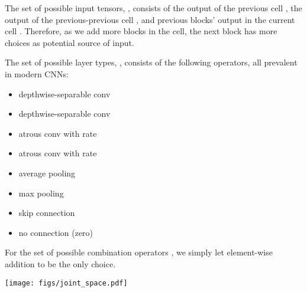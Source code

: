 \documentclass[10pt,twocolumn,letterpaper]{article}
\makeatletter
\def\@onedot{\ifx\@let@token.\else.\null\fi\xspace}
\DeclareRobustCommand\onedot{\futurelet\@let@token\@onedot}
\newcommand{\secref}[1]{Sec\onedot~\ref{#1}}
\makeatother
\begin{document}
The set of possible input tensors, , consists of the output of the previous cell , the output of the previous-previous cell , and previous blocks' output in the current cell .
Therefore, as we add more blocks in the cell, the next block has more choices as potential source of input.

The set of possible layer types, , consists of the following  operators, all prevalent in modern CNNs:

\begin{minipage}{0.55\linewidth}
\small
\medbreak
\begin{itemize}[leftmargin=*, nolistsep]
\item  depthwise-separable conv
\item  depthwise-separable conv
\item  atrous conv with rate 
\item  atrous conv with rate 
\end{itemize}
\medbreak
\end{minipage}
\begin{minipage}{0.39\linewidth}
\small
\medbreak
\begin{itemize}[leftmargin=*, nolistsep]
\item  average pooling
\item  max pooling
\item skip connection
\item no connection (zero)
\end{itemize}
\medbreak
\end{minipage}

For the set of possible combination operators , we simply let element-wise addition to be the only choice.

\begin{figure*}[t]
    \centering
    \texttt{[image: figs/joint\_space.pdf]}
    \caption{
    \emph{Left:} Our network level search space with . Gray nodes represent the fixed ``stem'' layers, and a path along the blue nodes represents a candidate network level architecture.
    \emph{Right:} During the search, each cell is a densely connected structure as described in \secref{sec:relax_cell}. Every yellow arrow is associated with the set of values . The three arrows after \texttt{concat} are associated with  respectively, as described in \secref{sec:relax_network}.
    Best viewed in color.}
    \label{fig:joint_space}
\end{figure*}
\end{document}
